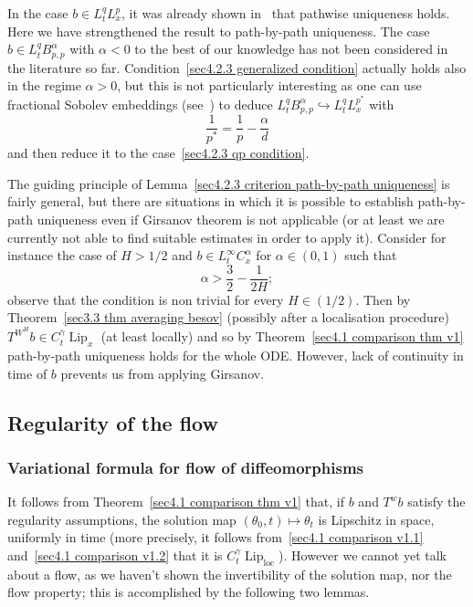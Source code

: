 \documentclass[10pt]{article}
\newcommand{\tmop}[1]{\ensuremath{\operatorname{#1}}}
\begin{document}
In the case $b \in L^q_t L^p_x$, it was already shown in~{\cite{le}} that
pathwise uniqueness holds. Here we have strengthened the result to
path\mbox{-}by\mbox{-}path uniqueness. The case $b \in L^q_t B^{\alpha}_{p,
p}$ with $\alpha < 0$ to the best of our knowledge has not been considered in
the literature so far. Condition~{\eqref{sec4.2.3 generalized condition}}
actually holds also in the regime $\alpha > 0$, but this is not particularly
interesting as one can use fractional Sobolev embeddings
(see~{\cite{dinezza}}) to deduce $L^q_t B^{\alpha}_{p, p} \hookrightarrow
L^q_t L^{p^{\ast}}_x$ with
\[ \frac{1}{p^{\ast}} = \frac{1}{p} - \frac{\alpha}{d} \]
and then reduce it to the case~{\eqref{sec4.2.3 qp condition}}.

\begin{remark}
  The guiding principle of Lemma~\ref{sec4.2.3 criterion path-by-path
  uniqueness} is fairly general, but there are situations in which it is
  possible to establish path\mbox{-}by\mbox{-}path uniqueness even if Girsanov
  theorem is not applicable (or at least we are currently not able to find
  suitable estimates in order to apply it). Consider for instance the case of
  $H > 1 / 2$ and $b \in L^{\infty}_t C^{\alpha}_x$ for $\alpha \in (0, 1)$
  such that
  \[ \alpha > \frac{3}{2} - \frac{1}{2 H} ; \]
  observe that the condition is non trivial for every $H \in (1 / 2)$. Then by
  Theorem~\ref{sec3.3 thm averaging besov} (possibly after a localisation
  procedure) $T^{W^H} b \in C^{\gamma}_t \tmop{Lip}_x$ (at least locally) and
  so by Theorem~\ref{sec4.1 comparison thm v1} path\mbox{-}by\mbox{-}path
  uniqueness holds for the whole ODE. However, lack of continuity in time of
  $b$ prevents us from applying Girsanov.
\end{remark}

\subsection{Regularity of the flow}\label{sec4.3}

\subsubsection{Variational formula for flow of
diffeomorphisms}\label{sec4.3.1}\label{sec4.3.1}

It follows from Theorem~\ref{sec4.1 comparison thm v1} that, if $b$ and $T^w
b$ satisfy the regularity assumptions, the solution map $(\theta_0, t) \mapsto
\theta_t$ is Lipschitz in space, uniformly in time (more precisely, it follows
from~{\eqref{sec4.1 comparison v1.1}} and~{\eqref{sec4.1 comparison v1.2}}
that it is $C^{\gamma}_t \tmop{Lip}_{\tmop{loc}}$). However we cannot yet talk
about a flow, as we haven't shown the invertibility of the solution map, nor
the flow property; this is accomplished by the following two lemmas.
\end{document}
